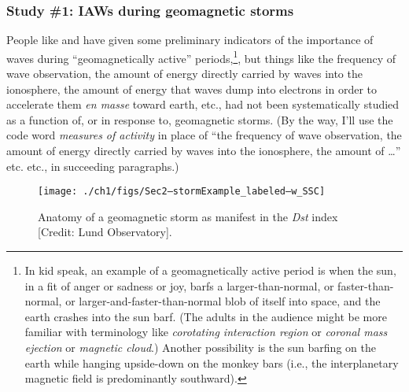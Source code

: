\subsubsection{Study \#1: IAWs during geomagnetic storms}

People like \citet{Chaston2007} and \citet{Newell2009} have given some
preliminary indicators of the importance of \Alf waves during ``geomagnetically
active'' periods,\footnote{In kid speak, an example of a geomagnetically active
  period is when the sun, in a fit of anger or sadness or joy, barfs a
  larger-than-normal, or faster-than-normal, or larger-and-faster-than-normal
  blob of itself into space, and the earth crashes into the sun barf. (The
  adults in the audience might be more familiar with terminology like
  \emph{corotating interaction region} or \emph{coronal mass ejection} or
  \emph{magnetic cloud}.) Another possibility is the sun barfing on the earth
  while hanging upside-down on the monkey bars (i.e., the interplanetary
  magnetic field is predominantly southward).}, but things like the frequency of
\Alf wave observation, the amount of energy directly carried by \Alf waves into
the ionosphere, the amount of energy that \Alf waves dump into electrons in
order to accelerate them \textit{en masse} toward earth, etc., had not been
systematically studied as a function of, or in response to, geomagnetic
storms. (By the way, I'll use the code word \emph{measures of \Alfic activity}
in place of ``the frequency of \Alf wave observation, the amount of energy
directly carried by \Alf waves into the ionosphere, the amount of \dots''
etc. etc., in succeeding paragraphs.)


\begin{figure}
  \centering
  \noindent\texttt{[image: ./ch1/figs/Sec2--stormExample\_labeled--w\_SSC]}
  \caption[Anatomy of a geomagnetic storm \`{a} la \textit{Dst}]{Anatomy of a
    geomagnetic storm as manifest in the \textit{Dst} index [Credit: Lund
    Observatory].}
  \label{ch1:fDstStorm}
\end{figure}


